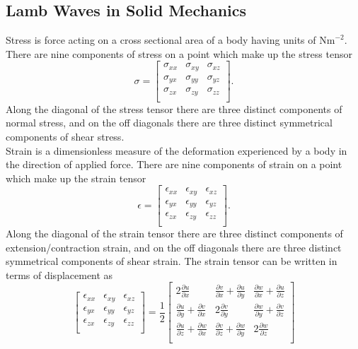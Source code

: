 \documentclass[twoside]{bsu-ms}
\begin{document}
\subsection{Lamb Waves in Solid Mechanics}\label{subsec:1.1.1}
Stress is force acting on a cross sectional area of a body having units of $\mathrm{Nm}^{-2}$. There are nine components of stress on a point which make up the stress tensor
\begin{equation}\label{eq:1.1}
    \mathbf{\mathsf{\sigma}} = \begin{bmatrix}
        \sigma_{xx}&\sigma_{xy}&\sigma_{xz}\\
	\sigma_{yx}&\sigma_{yy}&\sigma_{yz}\\
	\sigma_{zx}&\sigma_{zy}&\sigma_{zz}\\
    \end{bmatrix}.
\end{equation}
Along the diagonal of the stress tensor there are three distinct components of normal stress, and on the off diagonals there are three distinct symmetrical components of shear stress.\\
\indent Strain is a dimensionless measure of the deformation experienced by a body in the direction of applied force. There are nine components of strain on a point  which make up the strain tensor
\begin{equation}\label{eq:1.2}
    \mathbf{\mathsf{\epsilon}}=\begin{bmatrix}
        \epsilon_{xx}&\epsilon_{xy}&\epsilon_{xz}\\
	\epsilon_{yx}&\epsilon_{yy}&\epsilon_{yz}\\
	\epsilon_{zx}&\epsilon_{zy}&\epsilon_{zz}\\
    \end{bmatrix}.
\end{equation}
Along the diagonal of the strain tensor there are three distinct components of extension/contraction strain, and on the off diagonals there are three distinct symmetrical components of shear strain. The strain tensor can be written in terms of displacement as
\begin{equation}\label{eq:1.3}
    \begin{bmatrix}
        \epsilon_{xx}&\epsilon_{xy}&\epsilon_{xz}\\
	\epsilon_{yx}&\epsilon_{yy}&\epsilon_{yz}\\
	\epsilon_{zx}&\epsilon_{zy}&\epsilon_{zz}\\
    \end{bmatrix}=\frac{1}{2}\begin{bmatrix}
        2\frac{\partial u}{\partial x}&\frac{\partial v}{\partial x}+\frac{\partial u}{\partial y}&\frac{\partial w}{\partial x}+\frac{\partial u}{\partial z}\\
	\frac{\partial u}{\partial y}+\frac{\partial v}{\partial x}&2\frac{\partial v}{\partial y}&\frac{\partial w}{\partial y}+\frac{\partial v}{\partial z}\\
	\frac{\partial u}{\partial z}+\frac{\partial w}{\partial x}&\frac{\partial v}{\partial z}+\frac{\partial w}{\partial y}&2\frac{\partial w}{\partial z}\\
    \end{bmatrix}
\end{equation}
\end{document}
